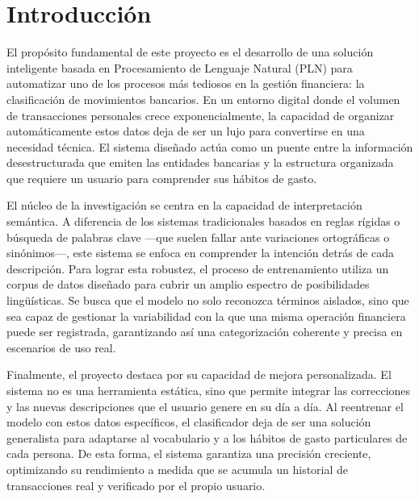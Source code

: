 \section{Introducción}
\label{sec:introduccion}

El propósito fundamental de este proyecto es el desarrollo de una solución inteligente basada en Procesamiento de Lenguaje Natural (PLN) para automatizar uno de los procesos más tediosos en la gestión financiera: la clasificación de movimientos bancarios. En un entorno digital donde el volumen de transacciones personales crece exponencialmente, la capacidad de organizar automáticamente estos datos deja de ser un lujo para convertirse en una necesidad técnica. El sistema diseñado actúa como un puente entre la información desestructurada que emiten las entidades bancarias y la estructura organizada que requiere un usuario para comprender sus hábitos de gasto.

El núcleo de la investigación se centra en la capacidad de interpretación semántica. A diferencia de los sistemas tradicionales basados en reglas rígidas o búsqueda de palabras clave —que suelen fallar ante variaciones ortográficas o sinónimos—, este sistema se enfoca en comprender la intención detrás de cada descripción. Para lograr esta robustez, el proceso de entrenamiento utiliza un corpus de datos diseñado para cubrir un amplio espectro de posibilidades lingüísticas. Se busca que el modelo no solo reconozca términos aislados, sino que sea capaz de gestionar la variabilidad con la que una misma operación financiera puede ser registrada, garantizando así una categorización coherente y precisa en escenarios de uso real.

Finalmente, el proyecto destaca por su capacidad de mejora personalizada. El sistema no es una herramienta estática, sino que permite integrar las correcciones y las nuevas descripciones que el usuario genere en su día a día. Al reentrenar el modelo con estos datos específicos, el clasificador deja de ser una solución generalista para adaptarse al vocabulario y a los hábitos de gasto particulares de cada persona. De esta forma, el sistema garantiza una precisión creciente, optimizando su rendimiento a medida que se acumula un historial de transacciones real y verificado por el propio usuario.
